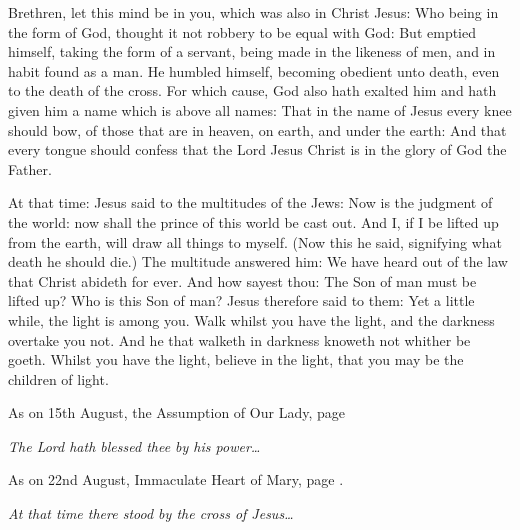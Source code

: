




Brethren, let this mind be in you, which was also in Christ Jesus: Who being in the
form of God, thought it not robbery to be equal with God: But emptied himself,
taking the form of a servant, being made in the likeness of men, and in habit
found as a man.
  He humbled
himself, becoming obedient unto death, even to the death of the cross.  For
which cause, God also hath exalted him and hath given him a name which is above
all names: That in the name of Jesus every knee should bow, of those that are
in heaven, on earth, and under the earth: And that every tongue should confess
that the Lord Jesus Christ is in the glory of God the Father.



At that time: Jesus said to the multitudes of the Jews:
Now is the judgment of the world: now shall the prince of this
world be cast out.
And I, if I be lifted up from the earth, will draw all things to
myself.
(Now this he said, signifying what death he should die.)
The multitude answered him: We have heard out of the law that
Christ abideth for ever. And how sayest thou: The Son of man must be
lifted up? Who is this Son of man?
Jesus therefore said to them: Yet a little while, the light is
among you. Walk whilst you have the light, and the darkness overtake you
not. And he that walketh in darkness knoweth not whither be goeth.
Whilst you have the light, believe in the light, that you may be
the children of light. %


\bigskip




As on 15th August, the Assumption of Our Lady, page \pageref{Ep.assump}

\emph{The Lord hath
blessed thee by his power\ldots}


As on 22nd August, Immaculate Heart of Mary, page \pageref{Go.stabant}.

\emph{At that time there stood by the cross of Jesus\ldots}

